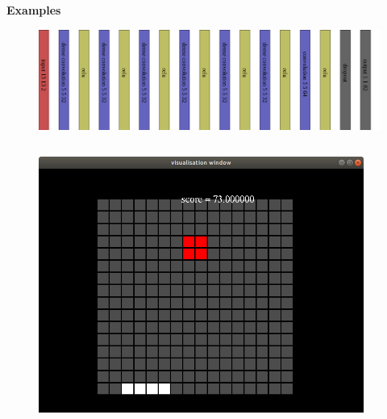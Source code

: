 \documentclass[xcolor=dvipsnames]{beamer}
\begin{document}
\begin{frame}{\bf Examples}


\begin{figure}
\includegraphics[scale=0.11]{../../pictures/go_cnn_architecture.png}
\end{figure}

\begin{columns}
\begin{column}{0.5\textwidth}

  \begin{figure}
    \includegraphics[scale=0.18]{../../pictures/catcher.png}
  \end{figure}

\end{column}
\begin{column}{0.5\textwidth}  %


\end{column}
\end{columns}
\end{frame}
\end{document}

